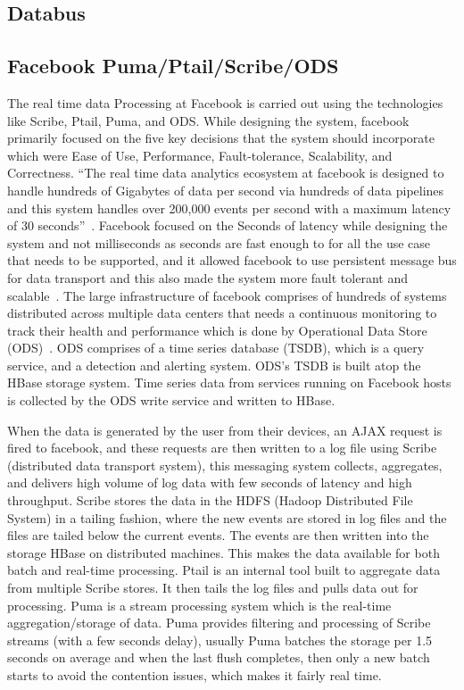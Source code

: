      \pv

\subsection{Databus}

\pv 

\subsection{Facebook Puma/Ptail/Scribe/ODS}
     
The real time data Processing at Facebook is carried out using the
technologies like Scribe, Ptail, Puma, and ODS. While designing the
system, facebook primarily focused on the five key decisions that the
system should incorporate which were Ease of Use, Performance,
Fault-tolerance, Scalability, and Correctness. ``The real time data
analytics ecosystem at facebook is designed to handle hundreds of
Gigabytes of data per second via hundreds of data pipelines and this
system handles over 200,000 events per second with a maximum latency
of 30 seconds''~\cite{www-facebook}. Facebook focused on the Seconds
of latency while designing the system and not milliseconds as seconds
are fast enough to for all the use case that needs to be supported,
and it allowed facebook to use persistent message bus for data
transport and this also made the system more fault tolerant and
scalable~\cite{www-facebook}. The large infrastructure of facebook
comprises of hundreds of systems distributed across multiple data
centers that needs a continuous monitoring to track their health and
performance which is done by Operational Data Store
(ODS)~\cite{facebook-paper-2016}. ODS comprises of a time series
database (TSDB), which is a query service, and a detection and
alerting system. ODS's TSDB is built atop the HBase storage
system. Time series data from services running on Facebook hosts is
collected by the ODS write service and written to HBase.

     When the data is generated by the user from their devices, an
     AJAX request is fired to facebook, and these requests are then
     written to a log file using Scribe (distributed data transport
     system), this messaging system collects, aggregates, and delivers
     high volume of log data with few seconds of latency and high
     throughput. Scribe stores the data in the HDFS (Hadoop
     Distributed File System) in a tailing fashion, where the new
     events are stored in log files and the files are tailed below the
     current events. The events are then written into the storage
     HBase on distributed machines. This makes the data available for
     both batch and real-time processing. Ptail is an internal tool
     built to aggregate data from multiple Scribe stores. It then
     tails the log files and pulls data out for processing. Puma is a
     stream processing system which is the real-time
     aggregation/storage of data. Puma provides filtering and
     processing of Scribe streams (with a few seconds delay), usually
     Puma batches the storage per 1.5 seconds on average and when the
     last flush completes, then only a new batch starts to avoid the
     contention issues, which makes it fairly real time.
     

